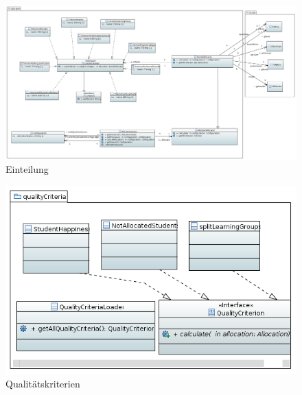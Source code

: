 \documentclass[parskip=full]{scrartcl}
\begin{document}
\begin{figure}
\centering
\includegraphics[width=\linewidth]{bilder/einteilung.png}
\caption{Einteilung}
\label{uml:allocation}
\end{figure}

\begin{figure}
\centering
\includegraphics[width=\linewidth]{bilder/qualityCriteria.png}
\caption{Qualitätskriterien}
\label{uml:qualityCriteria}
\end{figure}
\end{document}
